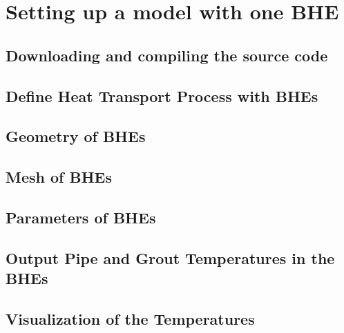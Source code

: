 \chapter{Setting up a model with one BHE}

\section{Downloading and compiling the source code}

\section{Define Heat Transport Process with BHEs}

\section{Geometry of BHEs}

\section{Mesh of BHEs}

\section{Parameters of BHEs}

\section{Output Pipe and Grout Temperatures in the BHEs}

\section{Visualization of the Temperatures}


